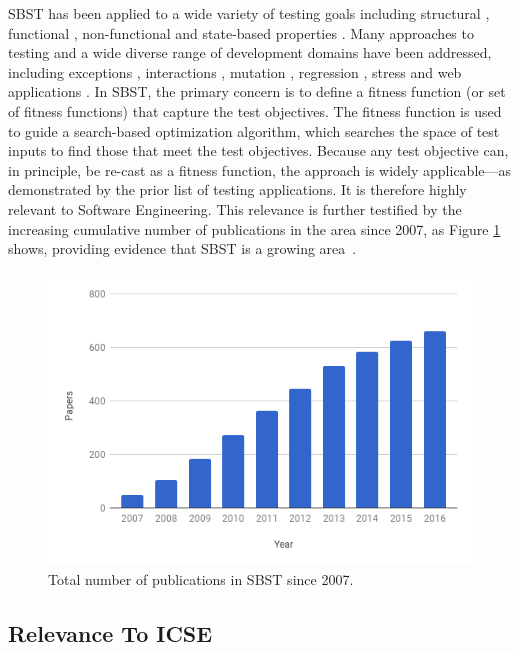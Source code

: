 \documentclass[10pt,conference]{IEEEtran}
\begin{document}
SBST has been applied to a wide variety of testing goals including
structural \cite{tonella:classes}, functional \cite{wegener:parking},
non-functional \cite{wegener:verifying} and state-based properties
\cite{joshmh:gecco11}.  Many approaches to testing and a wide diverse
range of development domains have been addressed, including exceptions
\cite{tracey-00}, interactions \cite{cohen:constructing},
mutation \cite{zhan:search-based}, regression \cite{syetal:issta09},
stress \cite{briand-stress-small} and web applications
\cite{Thome14:sec}. In SBST, the primary concern is to define a
fitness function (or set of fitness functions) that capture the test
objectives.  The fitness function is used to guide a search-based
optimization algorithm, which searches the space of test inputs to
find those that meet the test objectives.  Because any test objective
can, in principle, be re-cast as a fitness function, the approach is
widely applicable---as demonstrated by the prior list of testing
applications.  It is therefore highly relevant to Software
Engineering.  This relevance is further testified by the increasing
cumulative number of publications in the area since 2007, as Figure
\ref{fig:pubs} shows, providing evidence that SBST is a growing
area~\cite{yzmham:sbse-repository}.

\begin{figure}
\centering
\includegraphics[width=.7\columnwidth]{chart.png}
\caption{\label{fig:pubs}Total number of publications in SBST since
  2007.}
\end{figure}


\subsection{Relevance To ICSE}
\label{sec:relevance-icse}
\end{document}
